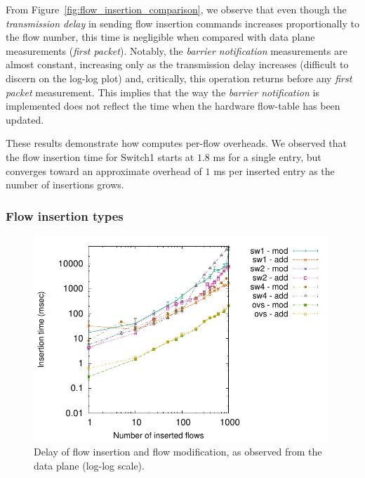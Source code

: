 From Figure~\ref{fig:flow_insertion_comparison}, we observe that even though the
\textit{transmission delay} in sending flow insertion commands increases
proportionally to the flow number, this time is negligible when compared with
data plane measurements (\textit{first packet}). Notably, the \textit{barrier
  notification} measurements are almost constant, increasing only as the
transmission delay increases (difficult to discern on the log-log plot) and,
critically, this operation returns before any \textit{first packet} measurement.
This implies that the way the \textit{barrier notification} is implemented does
not reflect the time when the hardware flow-table has been updated.

These results demonstrate how \oflops computes per-flow overheads. We
observed that the flow insertion time for Switch1 starts at $1.8$ ms for a single
entry, but converges toward an approximate overhead of $1$ ms per inserted entry
as the number of insertions grows.

\subsubsection*{Flow insertion types}

\begin{figure}[h]
  \begin{center}
    \includegraphics[width=0.99\textwidth]{Chapter1/Chapter1Figs/flow_insertion_delay}
  \end{center}
  \caption{Delay of flow insertion and flow modification, as observed
    from the data plane (log-log scale).}
  \label{fig:flow_insertion_delay}
\end{figure}

